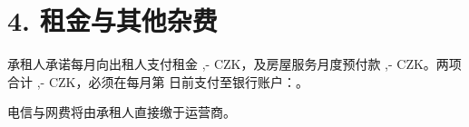 \section*{4. 租金与其他杂费}
承租人承诺每月向出租人支付租金 \Rentrentamount,- CZK，及房屋服务月度预付款 \Rentservicesamount,- CZK。两项合计 \Renttotalamount,- CZK，必须在每月第 \Rentpaymentday 日前支付至银行账户：\Rentbankaccount。

电信与网费将由承租人直接缴于运营商。
